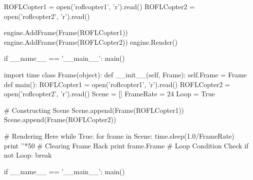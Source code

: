 \documentclass{article}
\begin{document}
\begin{python}[caption=IoC.py]
    ROFLCopter1 = open('roflcopter1', 'r').read()                               
    ROFLCopter2 = open('roflcopter2', 'r').read()                               

    engine.AddFrame(Frame(ROFLCopter1))                                         
    engine.AddFrame(Frame(ROFLCopter2))                                         
    engine.Render()                                                             

if __name__ == '__main__':                                                      
    main() 
\end{python}

\begin{python}[caption=Tradition.py]
import time                                                                     
class Frame(object):                                                            
    def __init__(self, Frame):                                                  
        self.Frame = Frame                                                      
def main():                                                                     
    ROFLCopter1 = open('roflcopter1', 'r').read()                               
    ROFLCopter2 = open('roflcopter2', 'r').read()                               
    Scene = []                                                                  
    FrameRate = 24                                                              
    Loop = True                                                                 
                                                                                
    # Constructing Scene                                                        
    Scene.append(Frame(ROFLCopter1))                                            
    Scene.append(Frame(ROFLCopter2))                                            
                                                                                
    # Rendering Here                                                            
    while True:                                                                 
        for frame in Scene:                                                     
            time.sleep(1.0/FrameRate)                                           
            print '\n'*50   # Clearing Frame Hack                               
            print frame.Frame                                                   
        # Loop Condition Check                                                  
        if not Loop:                                                            
            break                                                               
                                                                                
if __name__ == '__main__':                                                      
    main()   
\end{python}
\end{document}
